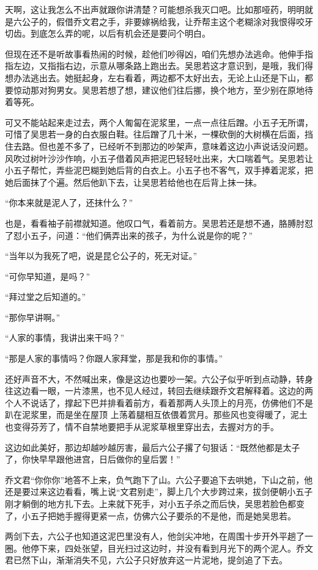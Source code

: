 天啊，这让我怎么不出声就跟你讲清楚？可能想杀我灭口吧。比如那哑药，明明就是六公子的，假借乔文君之手，非要嫁祸给我，让乔帮主这个老糊涂对我恨得咬牙切齿。到底怎么弄的呢，以后有机会还是要问个明白。

但现在还不是听故事看热闹的时候，趁他们吵得凶，咱们先想办法逃命。他伸手指指左边，又指指右边，示意从哪条路上跑出去。吴思若这才意识到，是哦，我们得想办法逃出去。她挺起身，左右看着，两边都不太好出去，无论上山还是下山，都要惊动那对狗男女。吴思若想了想，建议他们往后挪，换个地方，至少别在原地待着等死。

可又不能站起来走过去，两个人匍匐在泥浆里，一点一点往后蹭。小五子无所谓，可惜了吴思若一身的白衣服白鞋。往后蹭了几十米，一棵砍倒的大树横在后面，挡住去路。但也差不多了，已经听不到那边的吵架声，意味着这边小声说话没问题。风吹过树叶沙沙作响，小五子借着风声把泥巴轻轻吐出来，大口喘着气。吴思若让小五子帮忙，弄些泥巴糊到她后背的白衣上。小五子也不客气，双手捧着泥浆，把她后面抹了个遍。然后他趴下去，让吴思若给他也在后背上抹一抹。

“你本来就是泥人了，还抹什么？”

也是，看看袖子前襟就知道。他叹口气，看着前方。吴思若还是想不通，胳膊肘怼了怼小五子，问道：“他们俩弄出来的孩子，为什么说是你的呢？”

“当年以为我死了吧，说是昆仑公子的，死无对证。”

“可你早知道，是吗？”

“拜过堂之后知道的。”

“那你早讲啊。”

“人家的事情，我讲出来干吗？”

“那是人家的事情吗？你跟人家拜堂，那是我和你的事情。”

还好声音不大，不然喊出来，像是这边也要吵一架。六公子似乎听到点动静，转身往这边看一眼，一片漆黑，也不见人经过，转回去继续跟乔文君解释着。这边的两个人不说话了，撑起下巴并排看着前方，看着那两人头顶上的月亮，仿佛他们不是趴在泥浆里，而是坐在屋顶
上荡着腿相互依偎着赏月。那些风也变得暖了，泥土也变得芬芳了，情不自禁地要把手从泥浆草根里穿出去，去握对方的手。

这边如此美好，那边却越吵越厉害，最后六公子撂了句狠话：“既然他都是太子了，你快早早跟他进宫，日后做你的皇后罢！”

乔文君“你你你”地答不上来，负气跑下了山。六公子要追下去哄她，下山之前，他还是要过来这边看看，嘴上说“文君别走”，脚上几个大步跨过来，拔剑便朝小五子刚才躺倒的地方扎下去。上来就下死手，对小五子杀之而后快，吴思若脸色都变了，小五子把她手握得更紧一点，仿佛六公子要杀的不是他，而是她吴思若。

两剑下去，六公子也知道这泥巴里没有人，他剑尖冲地，在周围十步开外平趟了一圈。他停下来，四处张望，目光扫过这边时，并没有看到月光下的两个泥人。乔文君已然下山，渐渐消失不见，六公子只好放弃这一片泥地，提剑追了下去。

